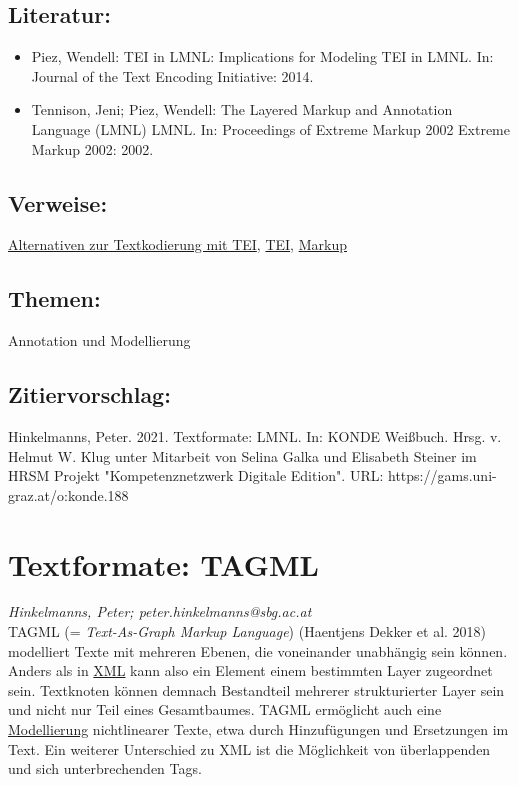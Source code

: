 \documentclass{article}
\begin{document}
        \subsection*{Literatur:}\begin{itemize}\item Piez, Wendell: TEI in LMNL: Implications for Modeling TEI in LMNL. In: Journal of the Text Encoding Initiative: 2014.\item Tennison, Jeni; Piez, Wendell: The Layered Markup and Annotation Language (LMNL) LMNL. In: Proceedings of Extreme Markup 2002 Extreme Markup 2002: 2002.\end{itemize}\subsection*{Verweise:}\href{https://gams.uni-graz.at/o:konde.15}{Alternativen zur Textkodierung mit TEI}, \href{https://gams.uni-graz.at/o:konde.178}{TEI}, \href{https://gams.uni-graz.at/o:konde.126}{Markup}\subsection*{Themen:}Annotation und Modellierung\subsection*{Zitiervorschlag:}Hinkelmanns, Peter. 2021. Textformate: LMNL. In: KONDE Weißbuch. Hrsg. v. Helmut W. Klug unter Mitarbeit von Selina Galka und Elisabeth Steiner im HRSM Projekt "Kompetenznetzwerk Digitale Edition". URL: https://gams.uni-graz.at/o:konde.188\newpage\section*{Textformate: TAGML} \emph{Hinkelmanns, Peter; peter.hinkelmanns@sbg.ac.at }\\
        
    TAGML (= \emph{Text-As-Graph Markup Language}) (Haentjens Dekker et al. 2018) modelliert Texte mit mehreren Ebenen, die voneinander unabhängig sein können. Anders als in \href{http://gams.uni-graz.at/o:konde.215}{XML} kann also ein Element einem bestimmten Layer zugeordnet sein. Textknoten können demnach Bestandteil mehrerer strukturierter Layer sein und nicht nur Teil eines Gesamtbaumes. TAGML ermöglicht auch eine \href{http://gams.uni-graz.at/o:konde.137}{Modellierung} nichtlinearer Texte, etwa durch Hinzufügungen und Ersetzungen im Text. Ein weiterer Unterschied zu XML ist die Möglichkeit von überlappenden und sich unterbrechenden Tags.\\
            
\end{document}
